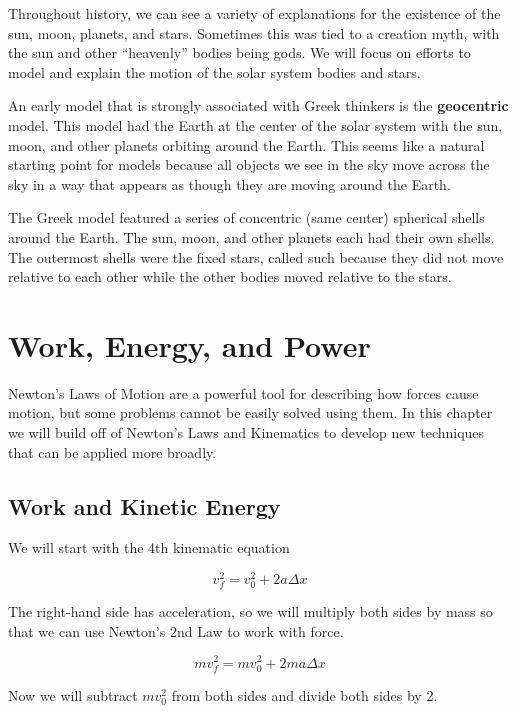 \documentclass[12pt]{book}
\begin{document}
Throughout history, we can see a variety of explanations for the existence of the sun, moon, planets, and stars. Sometimes this was tied to a creation myth, with the sun and other ``heavenly'' bodies being gods. We will focus on efforts to model and explain the motion of the solar system bodies and stars.

An early model that is strongly associated with Greek thinkers is the \textbf{geocentric} model. This model had the Earth at the center of the solar system with the sun, moon, and other planets orbiting around the Earth. This seems like a natural starting point for models because all objects we see in the sky move across the sky in a way that appears as though they are moving around the Earth.

The Greek model featured a series of concentric (same center) spherical shells around the Earth. The sun, moon, and other planets each had their own shells. The outermost shells were the fixed stars, called such because they did not move relative to each other while the other bodies moved relative to the stars.


\chapter{Work, Energy, and Power}
\setcounter{example}{1}
\addtocounter{chp}{1}

Newton's Laws of Motion are a powerful tool for describing how forces cause motion, but some problems cannot be easily solved using them. In this chapter we will build off of Newton's Laws and Kinematics to develop new techniques that can be applied more broadly.

\section{Work and Kinetic Energy}

We will start with the 4th kinematic equation

\begin{equation}
v_f^2 = v_0^2 + 2 a \Delta x
\end{equation}

The right-hand side has acceleration, so we will multiply both sides by mass so that we can use Newton's 2nd Law to work with force.

\begin{equation}
m v_f^2 = m v_0^2 + 2 ma \Delta x
\end{equation}

Now we will subtract $m v_0^2$ from both sides and divide both sides by 2.
\end{document}
